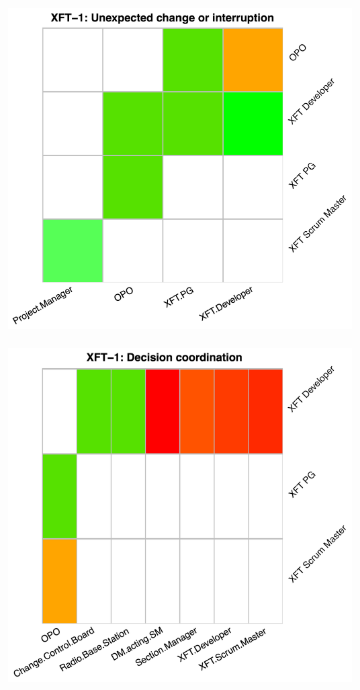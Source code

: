 \begin{figure}
\begin{subfigure}{.5\textwidth}
    \label{fig:hm-b-ms2}
  \end{subfigure}
  \begin{subfigure}{.5\textwidth}
    \centering
    \includegraphics[width=.91\linewidth]{figures/heatmaps/ms2-_u_.pdf}
    \label{fig:hm-u-ms2}
  \end{subfigure}%
  \begin{subfigure}{.5\textwidth}
    \centering
    \includegraphics[width=.91\linewidth]{figures/heatmaps/ms2-_d_.pdf}

\end{subfigure}
\end{figure}
